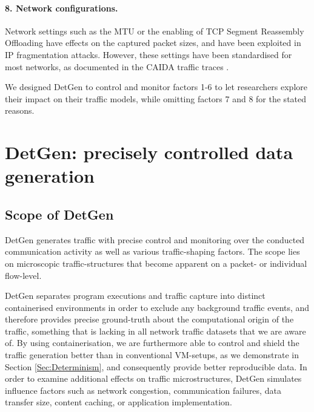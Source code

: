 \documentclass[runningheads]{llncs}
\begin{document}
\paragraph{8. Network configurations.}
Network settings such as the MTU or the enabling of TCP Segment Reassembly Offloading have effects on the captured packet sizes, and have been exploited in IP fragmentation attacks. However, these settings have been standardised for most networks, as documented in the CAIDA traffic traces \cite{walsworth2015caida}.




\vspace{0.3cm}
We designed DetGen to control and monitor factors 1-6 to let researchers explore their impact on their traffic models, while omitting factors 7 and 8 for the stated reasons.

\section{DetGen: precisely controlled data generation}\label{Sec:Archi}



\subsection{Scope of DetGen}

DetGen generates traffic with precise control and monitoring over the conducted communication activity as well as various traffic-shaping factors. The scope lies on microscopic traffic-structures that become apparent on a packet- or individual flow-level.

DetGen separates program executions and traffic capture into distinct containerised environments in order to exclude any background traffic events, and therefore provides precise ground-truth about the computational origin of the traffic, something that is lacking in all network traffic datasets that we are aware of. By using containerisation, we are furthermore able to control and shield the traffic generation better than in conventional VM-setups, as we demonstrate in Section \ref{Sec:Determinism}, and consequently provide better reproducible data. 
In order to examine additional effects on traffic microstructures, DetGen simulates influence factors such as network congestion, communication failures, data transfer size, content caching, or application implementation.
\end{document}

